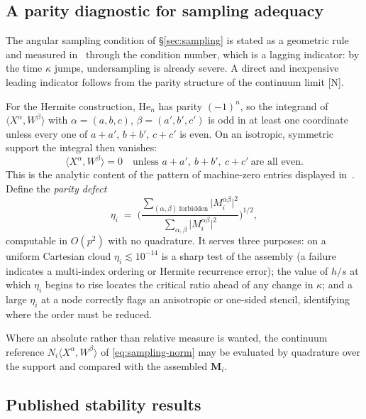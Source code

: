 \documentclass[11pt,a4paper]{article}
\newcommand{\New}{\textcolor{blue!60!black}{\textsf{[N]}}}
\begin{document}
\subsection{A parity diagnostic for sampling adequacy}
\label{sec:parity}

The angular sampling condition of \S\ref{sec:sampling} is stated as a geometric rule
and measured in~\cite{KLN2020} through the condition number, which is a lagging
indicator: by the time $\kappa$ jumps, undersampling is already severe. A direct and
inexpensive leading indicator follows from the parity structure of the continuum limit
\New.

For the Hermite construction, $\mathrm{He}_n$ has parity $(-1)^n$, so the integrand of
$\langle X^{\alpha},W^{\beta}\rangle$ with $\alpha=(a,b,c)$, $\beta=(a',b',c')$ is odd
in at least one coordinate unless every one of $a{+}a'$, $b{+}b'$, $c{+}c'$ is even. On
an isotropic, symmetric support the integral then vanishes:
\begin{equation}
\bigl\langle X^{\alpha},W^{\beta}\bigr\rangle=0
\quad\text{unless } a{+}a',\ b{+}b',\ c{+}c'\ \text{are all even.}
\label{eq:parity}
\end{equation}
This is the analytic content of the pattern of machine-zero entries displayed
in~\cite[Fig.~5]{KLN2020}. Define the \emph{parity defect}
\begin{equation}
\eta_i\;=\;\Biggl(
\frac{\sum_{(\alpha,\beta)\ \text{forbidden}}\bigl|M^{\alpha\beta}_i\bigr|^{2}}
{\sum_{\alpha,\beta}\bigl|M^{\alpha\beta}_i\bigr|^{2}}\Biggr)^{1/2},
\label{eq:parity-defect}
\end{equation}
computable in $O(p^{2})$ with no quadrature. It serves three purposes: on a uniform
Cartesian cloud $\eta_i\lesssim10^{-14}$ is a sharp test of the assembly (a failure
indicates a multi-index ordering or Hermite recurrence error); the value of $h/s$ at
which $\eta_i$ begins to rise locates the critical ratio ahead of any change in
$\kappa$; and a large $\eta_i$ at a node correctly flags an anisotropic or one-sided
stencil, identifying where the order must be reduced.

Where an absolute rather than relative measure is wanted, the continuum reference
$N_i\langle X^{\alpha},W^{\beta}\rangle$ of \eqref{eq:sampling-norm} may be evaluated
by quadrature over the support and compared with the assembled $\bm M_i$.

\subsection{Published stability results}
\label{sec:stab-pub}
\end{document}
